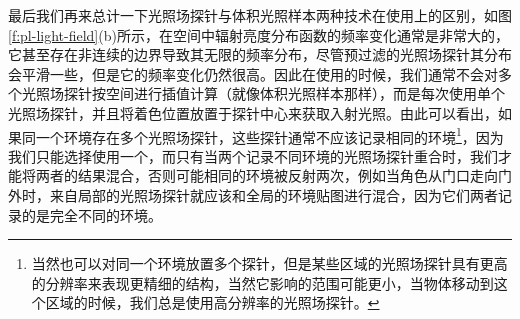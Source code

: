 最后我们再来总计一下光照场探针与体积光照样本两种技术在使用上的区别，如图\ref{f:pl-light-field}(b)所示，在空间中辐射亮度分布函数的频率变化通常是非常大的，它甚至存在非连续的边界导致其无限的频率分布，尽管预过滤的光照场探针其分布会平滑一些，但是它的频率变化仍然很高。因此在使用的时候，我们通常不会对多个光照场探针按空间进行插值计算（就像体积光照样本那样），而是每次使用单个光照场探针，并且将着色位置放置于探针中心来获取入射光照。由此可以看出，如果同一个环境存在多个光照场探针，这些探针通常不应该记录相同的环境\footnote{当然也可以对同一个环境放置多个探针，但是某些区域的光照场探针具有更高的分辨率来表现更精细的结构，当然它影响的范围可能更小，当物体移动到这个区域的时候，我们总是使用高分辨率的光照场探针。}，因为我们只能选择使用一个，而只有当两个记录不同环境的光照场探针重合时，我们才能将两者的结果混合，否则可能相同的环境被反射两次，例如当角色从门口走向门外时，来自局部的光照场探针就应该和全局的环境贴图进行混合，因为它们两者记录的是完全不同的环境。

